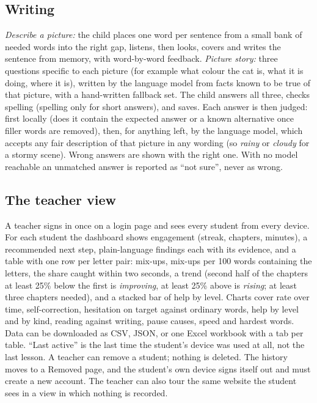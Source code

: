 \documentclass[manuscript, screen, review, anonymous]{acmart}
\begin{document}
\subsection{Writing}
\emph{Describe a picture:} the child places one word per sentence from a small bank of needed words into the right gap, listens, then looks, covers and writes the sentence from memory, with word-by-word feedback. \emph{Picture story:} three questions specific to each picture (for example what colour the cat is, what it is doing, where it is), written by the language model from facts known to be true of that picture, with a hand-written fallback set. The child answers all three, checks spelling (spelling only for short answers), and saves. Each answer is then judged: first locally (does it contain the expected answer or a known alternative once filler words are removed), then, for anything left, by the language model, which accepts any fair description of that picture in any wording (so \emph{rainy} or \emph{cloudy} for a stormy scene). Wrong answers are shown with the right one. With no model reachable an unmatched answer is reported as ``not sure'', never as wrong.

\subsection{The teacher view}
\label{sec:teacher}
A teacher signs in once on a login page and sees every student from every device. For each student the dashboard shows engagement (streak, chapters, minutes), a recommended next step, plain-language findings each with its evidence, and a table with one row per letter pair: mix-ups, mix-ups per 100 words containing the letters, the share caught within two seconds, a trend (second half of the chapters at least 25\% below the first is \emph{improving}, at least 25\% above is \emph{rising}; at least three chapters needed), and a stacked bar of help by level. Charts cover rate over time, self-correction, hesitation on target against ordinary words, help by level and by kind, reading against writing, pause causes, speed and hardest words. Data can be downloaded as CSV, JSON, or one Excel workbook with a tab per table. ``Last active'' is the last time the student's device was used at all, not the last lesson. A teacher can remove a student; nothing is deleted. The history moves to a Removed page, and the student's own device signs itself out and must create a new account. The teacher can also tour the same website the student sees in a view in which nothing is recorded.
\end{document}

